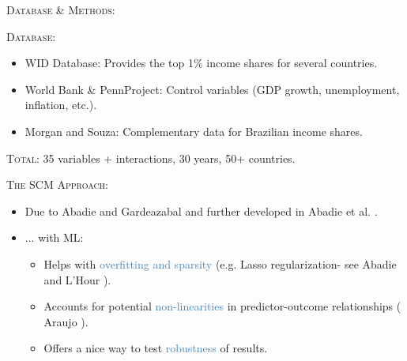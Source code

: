 \documentclass[11pt,aspectratio=169]{beamer}
\begin{document}
\begin{frame}{\textsc{Database \& Methods:}}

  \textsc{\color{harmonizedblue}Database:}
  \begin{itemize}
      \item \textcolor{primaryred}{WID Database:} Provides the top 1\% income shares for several countries.
      \item \textcolor{primaryred}{World Bank \& PennProject:} Control variables (GDP growth, unemployment, inflation, etc.).
      \item \textcolor{primaryred}{Morgan and Souza:} \cite{morgan2025distribution} Complementary data for Brazilian income shares.
  \end{itemize}

  \medskip
  \textsc{\color{harmonizedblue}Total:} 35 variables + interactions, 30 years, 50+ countries.
  \medskip

  \textsc{\color{harmonizedblue}The SCM Approach:}
  \begin{itemize}
      \item Due to \textcolor{primaryred}{Abadie and Gardeazabal} \cite{abadie2003economic} and further developed in \textcolor{primaryred}{Abadie et al.} \cite{abadie2010synthetic}.
      \item \textcolor{harmonizedblue}{... with ML:}
      \begin{itemize}
        \item[\textcolor{darkgreen}{\ding{51}}] Helps with \textcolor{steelblue}{overfitting and sparsity} (e.g. Lasso regularization- see \textcolor{primaryred}{Abadie and L'Hour} \cite{abadie_penalized_2021}).
        \item[\textcolor{darkgreen}{\ding{51}}] Accounts for potential \textcolor{steelblue}{non-linearities} in predictor-outcome relationships ( Araujo \cite{araujo2023synthetic}).
        \item[\textcolor{darkgreen}{\ding{51}}] Offers a nice way to test \textcolor{steelblue}{robustness} of results.
      \end{itemize}
  \end{itemize}

\end{frame}
\end{document}
